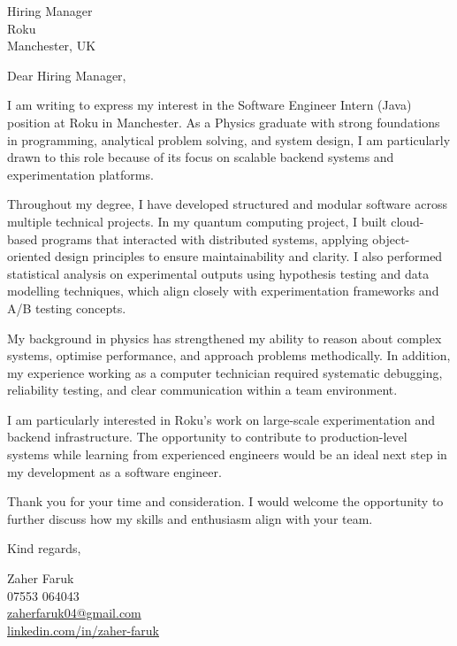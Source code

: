 \documentclass[11pt,a4paper]{letter}
\begin{document}
\begin{letter}{Hiring Manager \\ Roku \\ Manchester, UK}

\opening{Dear Hiring Manager,}

I am writing to express my interest in the Software Engineer Intern (Java) position at Roku in Manchester. As a Physics graduate with strong foundations in programming, analytical problem solving, and system design, I am particularly drawn to this role because of its focus on scalable backend systems and experimentation platforms.

Throughout my degree, I have developed structured and modular software across multiple technical projects. In my quantum computing project, I built cloud-based programs that interacted with distributed systems, applying object-oriented design principles to ensure maintainability and clarity. I also performed statistical analysis on experimental outputs using hypothesis testing and data modelling techniques, which align closely with experimentation frameworks and A/B testing concepts.

My background in physics has strengthened my ability to reason about complex systems, optimise performance, and approach problems methodically. In addition, my experience working as a computer technician required systematic debugging, reliability testing, and clear communication within a team environment.

I am particularly interested in Roku’s work on large-scale experimentation and backend infrastructure. The opportunity to contribute to production-level systems while learning from experienced engineers would be an ideal next step in my development as a software engineer.

Thank you for your time and consideration. I would welcome the opportunity to further discuss how my skills and enthusiasm align with your team.

\closing{Kind regards,}

Zaher Faruk \\
07553 064043 \\
\href{mailto:zaherfaruk04@gmail.com}{zaherfaruk04@gmail.com} \\
\href{https://www.linkedin.com/in/zaher-faruk/}{linkedin.com/in/zaher-faruk}

\end{letter}
\end{document}
